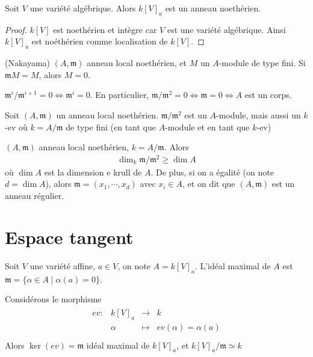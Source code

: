             \begin{coro}
                Soit $V$ une variété algébrique. Alors $k[V]_a$ est un anneau noethérien.
            \end{coro}
            \begin{proof}
                $k[V]$ est noethérien et intègre car $V$ est une variété algébrique. Ainsi $k[V]_a$ est noéthérien comme localisation de $k[V]$.
            \end{proof}
            \begin{lemm} (Nakayama)
                $(A, \mathfrak{m})$ anneau local noethérien, et $M$ un $A$-module de type fini. Si $\mathfrak{m} M = M$, alors $M = 0$.
            \end{lemm}
            \begin{coro}
                $\mathfrak{m}^i/ \mathfrak{m}^{i+1} = 0 \iff \mathfrak{m}^i = 0$. En particulier, $\mathfrak{m}/\mathfrak{m}^2 = 0 \iff \mathfrak{m} = 0 \iff A$ est un corps.
            \end{coro}
            \begin{remq}
                Soit $(A, \mathfrak{m})$ un anneau local noethérien. $\mathfrak{m}/\mathfrak{m}^2$ est un $A$-module, mais aussi un $k$-ev où $k = A/\mathfrak{m}$ de type fini (en tant que $A$-module et en tant que $k$-ev)
            \end{remq}
            \begin{theo}
                $(A, \mathfrak{m})$ anneau local noethérien, $k = A/\mathfrak{m}$. Alors
                \begin{align*}
                    \dim_k \mathfrak{m}/\mathfrak{m}^2 \geq \dim A
                \end{align*}
                où $\dim A$ est la dimension e krull de $A$. De plus, si on a égalité (on note $d = \dim A$), alors $\mathfrak{m} = (x_1, \cdots ,x_d)$ avec $x_i \in A$, et on dit que $(A, \mathfrak{m})$ est un anneau régulier.
            \end{theo}
        
    \section{Espace tangent}
        Soit $V$ une variété affine, $a \in V$, on note $A = k[V]_a$. L'idéal maximal de $A$ est $\mathfrak{m} = \{\alpha \in A \mid \alpha(a) = 0\}$.
        \begin{exo}
            Considérons le morphisme
            \begin{align*}
                \begin{array}{cccc}
                    ev : & k[V]_a & \to & k \\
                    & \alpha & \mapsto & ev(\alpha) = \alpha(a) \\
                \end{array}
            \end{align*}
            Alors $\ker(ev) = \mathfrak{m}$ idéal maximal de $k[V]_a$, et $k[V]_a/\mathfrak{m} \simeq k$
        \end{exo}
        
